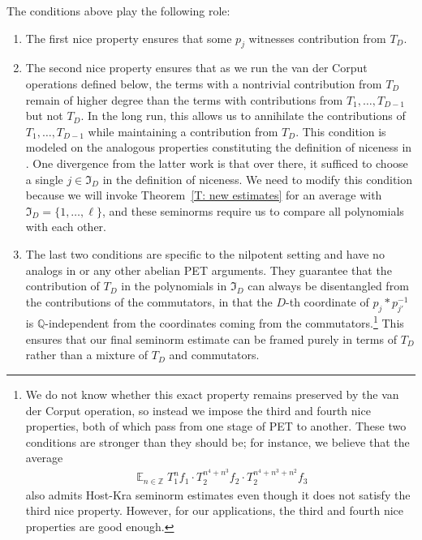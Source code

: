 \documentclass[11pt]{amsart}
\theoremstyle{definition}
\DeclareMathOperator*{\E}{\mathbb{E}}
\newcommand{\Q}{{\mathbb Q}}
\newcommand{\Z}{{\mathbb Z}}
\newcommand{\FI}{{\mathfrak I}}
\newcommand{\inv}{^{-1}}
\newcommand{\1}{{\mathbf{1}}}
\begin{document}
The conditions above play the following role:
\begin{enumerate}
    \item The first nice property ensures that some $p_j$ witnesses contribution from $T_D$.
    \item The second nice property ensures that as we run the van der Corput operations defined below, the terms with a nontrivial contribution from $T_D$ remain of higher degree than the terms with contributions from $T_1, \ldots, T_{D-1}$ but not $T_D$. In the long run, this allows us to annihilate the contributions of $T_1, \ldots, T_{D-1}$ while maintaining a contribution from $T_D$. This condition is modeled on the analogous properties constituting the definition of niceness in \cite[Section 5.2.1]{CFH11}. One divergence from the latter work is that over there, it sufficed to choose a single $j\in\FI_D$ in the definition of niceness. We need to modify this condition because we will invoke Theorem~\ref{T: new estimates} for an average with $\FI_D = \{1, \ldots, \ell\}$, and these seminorms require us to compare all polynomials with each other.
    \item {The last two conditions are specific to the nilpotent setting and have no analogs in \cite{CFH11} or any other abelian PET arguments. They guarantee that the contribution of $T_D$ in the polynomials in $\FI_D$ can always be disentangled from the contributions of the commutators, in that the $D$-th coordinate of $p_j*p_{j'}\inv$ is $\Q$-independent from the coordinates coming from the commutators.\footnote{We do not know whether this exact property remains preserved by the van der Corput operation, so instead we impose the third and fourth nice properties, both of which pass from one stage of PET to another. {These two conditions are stronger than they should be; for instance, we believe that the average \begin{align*}
        \E_{n\in\Z} T_1^{n}f_1\cdot T_2^{n^4 + n^3}f_2\cdot T_2^{n^4 + n^3 + n^2}f_3
    \end{align*}
    also admits Host-Kra seminorm estimates even though it does not satisfy the third nice property. However, for our applications, the third and fourth nice properties are good enough.}
    } 
    This ensures that our final seminorm estimate can be framed purely in terms of $T_D$ rather than a mixture of $T_D$ and commutators.} 
\end{enumerate}
\end{document}
